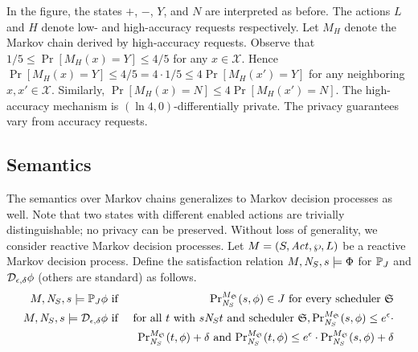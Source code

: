 In the figure, the states $+$,
$-$, $Y$, and $N$ are interpreted as before. The actions $L$ and $H$
denote low- and high-accuracy requests respectively. Let $M_H$ denote
the Markov chain derived by high-accuracy requests.
Observe that $1/5 \leq \Pr[M_H(x) = Y] \leq 4/5$ for any $x
\in \mathcal{X}$. Hence $\Pr[M_H (x) = Y] \leq 4/5 = 4 \cdot 1/5 \leq
4 \Pr[M_H (x') = Y]$ for any neighboring $x, x' \in
\mathcal{X}$. Similarly, $\Pr[M_H (x) = N] \leq 4 \Pr[M_H (x') =
N]$. The high-accuracy mechanism is $(\ln 4,0)$-differentially private.
The privacy guarantees vary from accuracy requests.

\subsection{Semantics}
The semantics over Markov chains generalizes to Markov decision
processes as well. Note that two states with different enabled actions
are trivially distinguishable; no privacy can be preserved. Without
loss of generality, we consider reactive Markov decision processes.
Let $M = (S, \Act, \wp, L)$ be a reactive Markov
decision process. Define the satisfaction
relation $M, \neighbor{S}, s \models \Phi$ for $\PJ{J}$ and $\dpriv{\epsilon}{\delta} \phi$ (others are standard) as follows.
\begin{eqnarray*}
  M, \neighbor{S}, s \models \PJ{J} \phi
  & \textmd{ if } &
  \myPr{s}{M_{\scheduler{S}}}{\neighbor{S}}{\phi} \in J
  \textmd{ for every scheduler } \scheduler{S}\\
  M, \neighbor{S}, s \models \dpriv{\epsilon}{\delta} \phi
  & \textmd{ if } &
  \textmd{for all } t \textmd{ with } s \neighbor{S} t \textmd{ and
   scheduler } \scheduler{S},
   \myPr{s}{M_{\scheduler{S}}}{\neighbor{S}}{\phi} \leq
  e^{\epsilon} \cdot
   \\
  & &
   \myPr{t}{M_{\scheduler{S}}}{\neighbor{S}}{\phi} + \delta
   \textmd{ and }
   \myPr{t}{M_{\scheduler{S}}}{\neighbor{S}}{\phi} \leq e^{\epsilon} \cdot
   \myPr{s}{M_{\scheduler{S}}}{\neighbor{S}}{\phi} + \delta
\end{eqnarray*}

